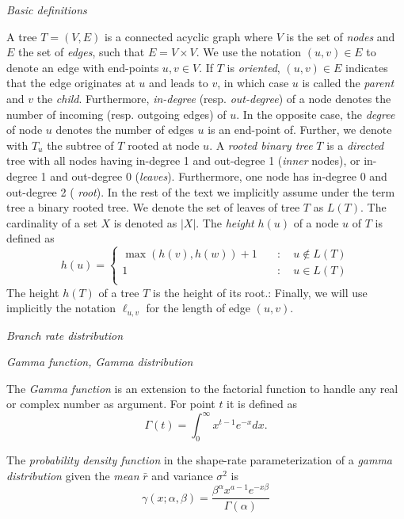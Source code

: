 \documentclass{llncs}
\renewcommand{\subsection}[1]{%
\bigskip
\begin{center}
\begin{large}
\normalfont\itshape #1
\end{large}
\end{center}}
\begin{document}
\subsection{Basic definitions}
%
A tree $T=(V,E)$ is a connected acyclic graph where $V$ is the set of {\em
nodes} and $E$ the set of {\em edges}, such that $E = V\times V$. We use the
notation $(u,v) \in E$ to denote an edge with end-points $u,v \in V$. If $T$ is
{\em oriented}, $(u,v) \in E$ indicates that the edge originates at $u$ and leads
to $v$, in which case $u$ is called the {\em parent} and $v$ the {\em child}.
Furthermore, {\em in-degree} (resp. {\em out-degree}) of a node denotes the
number of incoming (resp. outgoing edges) of $u$. In the opposite case, the
{\em degree} of node $u$ denotes the number of edges $u$ is an end-point of.
Further, we denote with $T_u$ the subtree of $T$ rooted at node $u$.  A {\em
rooted binary tree} $T$ is a {\em directed} tree with all nodes having
in-degree 1 and out-degree 1 ({\em inner} nodes), or in-degree 1 and out-degree
0 ({\em leaves}). Furthermore, one node has in-degree 0 and out-degree 2 ({\em
root}).  In the rest of the text we implicitly assume under the term tree a
binary rooted tree.  We denote the set of leaves of tree $T$ as $L(T)$.  The
cardinality of a set $X$ is denoted as $|X|$. The {\em height} $h(u)$ of a node
$u$ of $T$ is defined as 
%
\[ h(u) = \left\{ \begin{array}{ll}
\max(h(v), h(w)) + 1 & \quad : \quad u \notin L(T)\\
1                    & \quad : \quad u    \in L(T)\\
\end{array}\right. \] 
The height $h(T)$ of a tree $T$ is the height of its root.: Finally, we will
use implicitly the notation $\ell_{u,v}$ for the length of edge $(u,v)$.

\subsection{Branch rate distribution}
\subsection{Gamma function, Gamma distribution}

The {\em Gamma function} is an extension to the factorial function to handle
any real or complex number as argument. For point $t$ it is defined as
$$\Gamma(t) = \int_0^\infty x^{t-1} e^{-x} dx.$$

The {\em probability density function} in the shape-rate parameterization of a
{\em gamma distribution} given the {\em mean} $\bar{r}$ and variance $\sigma^2$ 
is
$$ \gamma(x;\alpha,\beta) = \frac{\beta^{\alpha}x^{a-1}e^{-x\beta}}{\Gamma(\alpha)} $$
\end{document}
